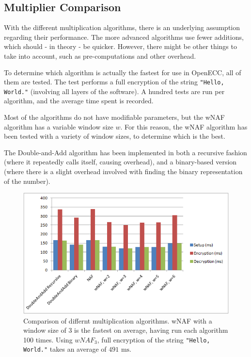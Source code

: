 \subsection{Multiplier Comparison}

With the different multiplication algorithms, there is an underlying assumption regarding their performance. The more
advanced algorithms use fewer additions, which should - in theory - be quicker. However, there might be other things
to take into account, such as pre-computations and other overhead.



To determine which algorithm is actually the fastest for use in OpenECC, all of them are tested. The test performs a
full  encryption of the string \verb+"Hello, World."+ (involving all layers of the software). A hundred tests are run
per algorithm, and the average time spent is recorded.

Most of the algorithms do not have modifiable parameters, but the wNAF algorithm has a variable window size \(w\). For
this reason, the wNAF algorithm has been tested with a variety of window sizes, to determine which is the best.

The Double-and-Add algorithm has been implemented in both a recursive fashion (where it repeatedly calls itself, causing
overhead), and a binary-based version (where there is a slight overhead involved with finding the binary representation
of the number).

\begin{figure}[htb!]
	\centering
	\includegraphics[width=\textwidth]{performance/multipliers-comparison}
	\caption{Comparison of differnt multiplication algorithms. wNAF with a window size of 3 is the fastest on average,
		having run each algorithm 100 times. Using \(wNAF_3\), full encryption of the string \texttt{"Hello, World."}
		takes an average of \(491 \text{ ms}\).}
	\label{fig:multipliers-comparison}
\end{figure}